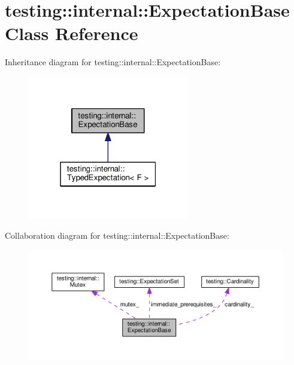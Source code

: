 \hypertarget{classtesting_1_1internal_1_1_expectation_base}{}\section{testing\+:\+:internal\+:\+:Expectation\+Base Class Reference}
\label{classtesting_1_1internal_1_1_expectation_base}


Inheritance diagram for testing\+:\+:internal\+:\+:Expectation\+Base\+:
\nopagebreak
\begin{figure}[H]
\begin{center}
\leavevmode
\includegraphics[width=199pt]{classtesting_1_1internal_1_1_expectation_base__inherit__graph}
\end{center}
\end{figure}


Collaboration diagram for testing\+:\+:internal\+:\+:Expectation\+Base\+:
\nopagebreak
\begin{figure}[H]
\begin{center}
\leavevmode
\includegraphics[width=350pt]{classtesting_1_1internal_1_1_expectation_base__coll__graph}
\end{center}
\end{figure}
